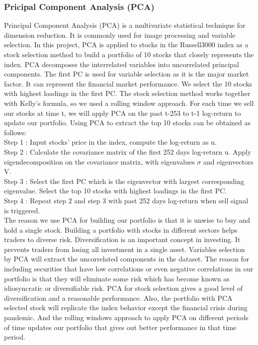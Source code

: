 \documentclass[11pt,a4paper]{article}
\begin{document}
    \subsubsection{Pricipal Component Analysis (PCA)}
    Principal Component Analysis (PCA) is a multivariate statistical technique for dimension reduction. It is commonly used for image processing and variable selection\cite{PCA}. In this project, PCA is applied to stocks in the Russell3000 index as a stock selection method to build a portfolio of 10 stocks that closely represents the index. PCA decomposes the interrelated variables into uncorrelated principal components. The first PC is used for variable selection as it is the major market factor. It can represent the financial market performance. We select the 10 stocks with highest loadings in the first PC. The stock selection method works together with Kelly's formula, so we used a rolling window approach. For each time we sell our stocks at time t, we will apply PCA on the past t-253 to t-1 log-return to update our portfolio.
    Using PCA to extract the top 10 stocks can be obtained as follows: \\
    Step 1 : Input stocks' price in the index, compute the log-return as u. \\
    Step 2 : Calculate the covariance matrix of the first 252 days log-return u. Apply eigendecomposition on the covariance matrix, with eigenvalues \(\sigma\) and eigenvectors V. \\
    Step 3 : Select the first PC which is the eigenvector with largest corresponding eigenvalue. Select the top 10 stocks with highest loadings in the first PC. \\
    Step 4 : Repeat step 2 and step 3 with past 252 days log-return when sell signal is triggered. \\
    
    \noindent
    The reason we use PCA for building our portfolio is that it is unwise to buy and hold a single stock. Building a portfolio with stocks in different sectors helps traders to diverse risk. Diversification is an important concept in investing. It prevents traders from losing all investment in a single asset. Variables selection by PCA will extract the uncorrelated components in the dataset.  The reason for including securities that have low correlations or even negative correlations in our portfolio is that they will eliminate some risk which has become known as idiosyncratic or diversifiable risk. PCA for stock selection gives a good level of diversification and a reasonable performance. Also, the portfolio with PCA selected stock will replicate the index behavior except the financial crisis during pandemic. And the rolling windows approach to apply PCA on different periods of time updates our portfolio that gives out better performance in that time period. \\
    
\end{document}
